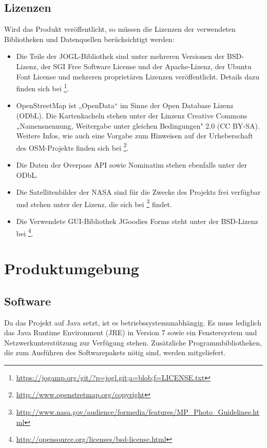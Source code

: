 \documentclass[10pt]{scrreprt}
\begin{document}
\pagebreak
\section{Lizenzen}
Wird das Produkt veröffentlicht, so müssen die Lizenzen der verwendeten Bibliotheken und Datenquellen berücksichtigt werden:
\begin{itemize}
\item Die Teile der JOGL-Bibliothek sind unter mehreren Versionen der BSD-Lizenz, der SGI Free Software License und der Apache-Lizenz, der Ubuntu Font License und mehreren proprietären Lizenzen veröffentlicht. Details dazu finden sich bei  \footnote{\url{https://jogamp.org/git/?p=jogl.git;a=blob;f=LICENSE.txt}}.
\item OpenStreetMap ist „OpenData“ im Sinne der Open Database Lizenz (ODbL). Die Kartenkacheln stehen unter der Linzenz  Creative Commons „Namensnennung, Weitergabe unter gleichen Bedingungen" 2.0 (CC BY-SA). Weitere Infos, wie auch eine Vorgabe zum Hinweisen auf der Urheberschaft des OSM-Projekts finden sich bei \footnote{\url{http://www.openstretmap.org/copyright}}.
\item Die Daten der Overpass API sowie Nominatim stehen ebenfalls unter der ODbL.
\item Die Satellitenbilder der NASA sind für die Zwecke des Projekts frei verfügbar und stehen unter der Lizenz, die sich bei \footnote{\url{http://www.nasa.gov/audience/formedia/features/MP_Photo_Guidelines.html}} findet.
\item Die Verwendete GUI-Bibliothek JGoodies Forms steht unter der BSD-Lizenz bei \footnote{\url{http://opensource.org/licenses/bsd-license.html}}.
\end{itemize}




\chapter{Produktumgebung}
\section{Software}
Da das Projekt auf Java setzt, ist es betriebssystemunabhängig. Es muss lediglich das Java Runtime Environment (JRE) in Version 7 sowie ein Fenstersystem und Netzwerkunterstützung zur Verfügung stehen. Zusätzliche Programmbibliotheken, die zum Ausführen des Softwarepakets nötig sind, werden mitgeliefert.\\
\end{document}

